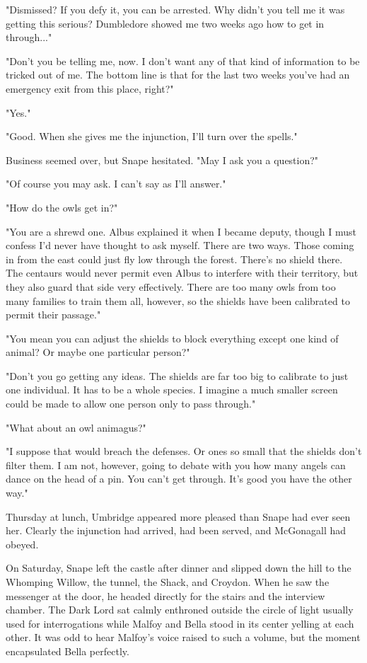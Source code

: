 \documentclass[a4paper,11pt]{article}
\begin{document}
"Dismissed? If you defy it, you can be arrested. Why didn't you tell me it was getting this serious? Dumbledore showed me two weeks ago how to get in through..."

"Don't you be telling me, now. I don't want any of that kind of information to be tricked out of me. The bottom line is that for the last two weeks you've had an emergency exit from this place, right?"

"Yes."

"Good. When she gives me the injunction, I'll turn over the spells."

Business seemed over, but Snape hesitated. "May I ask you a question?"

"Of course you may ask. I can't say as I'll answer."

"How do the owls get in?"

"You are a shrewd one. Albus explained it when I became deputy, though I must confess I'd never have thought to ask myself. There are two ways. Those coming in from the east could just fly low through the forest. There's no shield there. The centaurs would never permit even Albus to interfere with their territory, but they also guard that side very effectively. There are too many owls from too many families to train them all, however, so the shields have been calibrated to permit their passage."

"You mean you can adjust the shields to block everything except one kind of animal? Or maybe one particular person?"

"Don't you go getting any ideas. The shields are far too big to calibrate to just one individual. It has to be a whole species. I imagine a much smaller screen could be made to allow one person only to pass through."

"What about an owl animagus?"

"I suppose that would breach the defenses. Or ones so small that the shields don't filter them. I am not, however, going to debate with you how many angels can dance on the head of a pin. You can't get through. It's good you have the other way."

Thursday at lunch, Umbridge appeared more pleased than Snape had ever seen her. Clearly the injunction had arrived, had been served, and McGonagall had obeyed.

On Saturday, Snape left the castle after dinner and slipped down the hill to the Whomping Willow, the tunnel, the Shack, and Croydon. When he saw the messenger at the door, he headed directly for the stairs and the interview chamber. The Dark Lord sat calmly enthroned outside the circle of light usually used for interrogations while Malfoy and Bella stood in its center yelling at each other. It was odd to hear Malfoy's voice raised to such a volume, but the moment encapsulated Bella perfectly.
\end{document}
